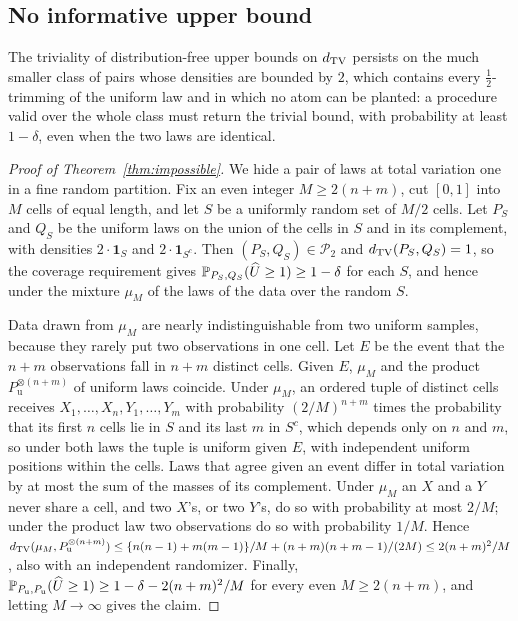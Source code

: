 \subsection{No informative upper bound}
\label{sec:upperimposs}

The triviality of distribution-free upper bounds on $d_{\mathrm{TV}}$ persists on the much
smaller class of pairs whose densities are bounded by $2$, which contains every $\tfrac12$-trimming of the uniform law
and in which no atom can be planted: a procedure valid over the whole class must return the trivial bound, with
probability at least $1-\delta$, even when the two laws are identical.

\begin{proof}[Proof of Theorem~\ref{thm:impossible}]
We hide a pair of laws at total variation one in a fine random partition. Fix an even integer $M\ge2(n+m)$, cut $[0,1]$ into $M$ cells of equal length, and let $S$ be a uniformly random set of
$M/2$ cells. Let $P_S$ and $Q_S$ be the uniform laws on the union of the cells in $S$ and in its complement, with
densities $2\cdot\mathbf 1_S$ and $2\cdot\mathbf 1_{S^c}$. Then $(P_S,Q_S)\in\mathcal P_2$ and $d_{\mathrm{TV}}(P_S,Q_S)=1$, so the
coverage requirement gives $\mathbb{P}_{P_S,Q_S}(\widehat U\ge1)\ge1-\delta$ for each $S$, and hence under the mixture $\mu_M$
of the laws of the data over the random $S$.

Data drawn from $\mu_M$ are nearly indistinguishable from two uniform samples, because they rarely put two
observations in one cell. Let $E$ be the event that the $n+m$ observations fall in $n+m$ distinct cells. Given $E$, $\mu_M$ and the product
$P_{\mathrm u}^{\otimes(n+m)}$ of uniform laws coincide. Under $\mu_M$, an ordered tuple of distinct cells receives
$X_1,\dots,X_n,Y_1,\dots,Y_m$ with probability $(2/M)^{n+m}$ times the probability that its first $n$ cells lie in $S$
and its last $m$ in $S^c$, which depends only on $n$ and $m$, so under both laws the tuple is uniform given $E$, with
independent uniform positions within the cells. Laws that agree given an event differ in total variation by at most
the sum of the masses of its complement. Under $\mu_M$ an $X$ and a $Y$ never share a cell, and two $X$'s, or two
$Y$'s, do so with probability at most $2/M$; under the product law two observations do so with probability $1/M$. Hence
$d_{\mathrm{TV}}(\mu_M,P_{\mathrm u}^{\otimes(n+m)})\le\{n(n-1)+m(m-1)\}/M+(n+m)(n+m-1)/(2M)\le2(n+m)^2/M$, also with an independent
randomizer. Finally,
$\mathbb{P}_{P_{\mathrm u},P_{\mathrm u}}(\widehat U\ge1)\ge1-\delta-2(n+m)^2/M$ for every even $M\ge2(n+m)$, and letting
$M\to\infty$ gives the claim.
\end{proof}

